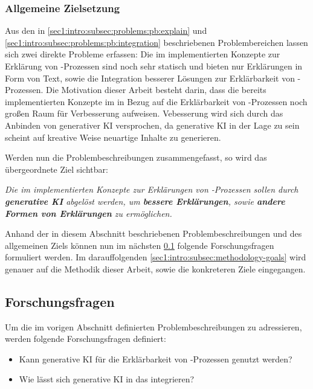 \subsubsection{Allgemeine Zielsetzung}
Aus den in \cref{sec1:intro:subsec:problems:pb:explain} und \cref{sec1:intro:subsec:problems:pb:integration} beschriebenen Problembereichen lassen sich zwei direkte Probleme erfassen:
Die im \gmaf{} implementierten Konzepte zur Erklärung von \mmir{}-Prozessen sind noch sehr statisch und bieten nur Erklärungen in Form von Text, sowie die Integration besserer Lösungen zur Erklärbarkeit von \mmir{}-Prozessen.
Die Motivation dieser Arbeit besteht darin, dass die bereits implementierten Konzepte im \gmaf{} in Bezug auf die Erklärbarkeit von \mmir{}-Prozessen noch großen Raum für Verbesserung aufweisen.
Vebesserung wird sich durch das Anbinden von generativer KI versprochen, da generative KI in der Lage zu sein scheint auf kreative Weise neuartige Inhalte zu generieren.

Werden nun die Problembeschreibungen zusammengefasst, so wird das übergeordnete Ziel sichtbar:

\textit{Die im \gmaf{} implementierten Konzepte zur Erklärungen von \mmir{}-Prozessen sollen durch \textbf{generative KI} abgelöst werden, um \textbf{bessere Erklärungen}, sowie \textbf{andere Formen von Erklärungen} zu ermöglichen.}

\clearpage
Anhand der in diesem Abschnitt beschriebenen Problembeschreibungen und des allgemeinen Ziels können nun im nächsten \cref{sec1:intro:subsec:research-questions} folgende Forschungsfragen formuliert werden. Im darauffolgenden \cref{sec1:intro:subsec:methodology-goals} wird genauer auf die Methodik dieser Arbeit, sowie die konkreteren Ziele eingegangen.

\subsection{Forschungsfragen}
\label{sec1:intro:subsec:research-questions}
Um die im vorigen Abschnitt definierten Problembeschreibungen zu adressieren, werden folgende Forschungsfragen definiert:
\begin{itemize}
    \item \researchquestion{} Kann generative KI für die Erklärbarkeit von \mmir{}-Prozessen genutzt werden?
    \item \researchquestion{} Wie lässt sich generative KI in das \gmaf{} integrieren?
\end{itemize}

